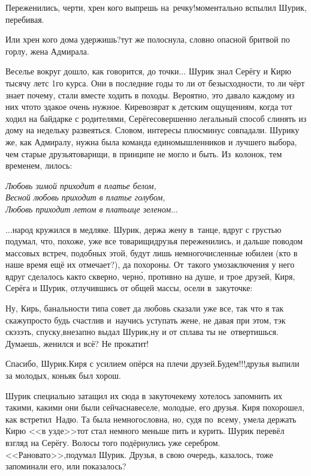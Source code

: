 {\diagdash Переженились, черти, хрен кого выпрешь на~речку!\mdash моментально вспылил Шурик, перебивая.

\diagdash Или хрен кого дома удержишь?\mdash тут же полоснула, словно опасной бритвой по горлу, жена Адмирала. 

Веселье вокруг дошло, как говорится, до точки$\ldots$ Шурик знал Серёгу и Кирю тысячу лет\mdash с 1\sdash го курса. Они в последние годы то ли от безысходности, то ли чёрт знает почему, стали вместе ходить в походы. Вероятно, это давало каждому из них что\sdash то эдакое очень нужное. Кире\mdash возврат к детским ощущениям, когда тот ходил на байдарке с родителями, Серёге\mdash совершенно легальный способ слинять из дому на недельку развеяться. Словом, интересы плюс\sdash минус совпадали. Шурику же, как Адмиралу, нужна была команда единомышленников и лучшего выбора, чем старые друзья\sdash товарищи, в принципе не могло и быть. Из~колонок, тем временем, лилось:

\vspace{0.1cm}
\noindent\textit{%
	\hspace*{1.4cm}Любовь зимой приходит в платье белом,\\
	\hspace*{1.4cm}Весной любовь приходит в платье голубом,\\
	\hspace*{1.4cm}Любовь приходит летом в платьице зеленом$\ldots$
}

$\ldots$народ кружился в медляке. Шурик, держа жену в~танце, вдруг с грустью подумал, что, похоже, уже все товарищи\sdash друзья переженились, и дальше поводом массовых встреч, подобных этой, будут лишь немногочисленные юбилеи (кто в наше время ещё их отмечает?), да похороны. От~такого умозаключения у него вдруг сделалось как\sdash то скверно, черн\'{о}, противно на душе, и трое друзей, Киря, Серёга и Шурик, отлучившись от общей массы, осели в~закуточке:

\diagdash Ну, Кирь, банальности типа совет да любовь сказали уже все, так что я так скажу\mdash просто будь счастлив и~научись уступать жене, не давая при этом, тэк скэзэть, спуску,\mdash внезапно выдал Шурик,\mdash ну и от сплава ты не~отвертишься. Думаешь, женился и всё? Не прокатит!

\diagdash Спасибо, Шурик.\mdash Киря с усилием опёрся на плечи друзей.\mdash Будем!!!\mdash друзья выпили за молодых, коньяк был хорош.

Шурик специально затащил их сюда в закуточек\mdash ему хотелось запомнить их такими, какими они были сейчас\mdash навеселе, молодые, его друзья. Киря похорошел, как встретил~Надю. Та была немногословна, но, судя по~всему, умела держать Кирю <<в узде>>\mdash тот стал немного меньше пить и курить. Шурик перевёл взгляд на Серёгу. Волосы того подёрнулись уже серебром. <<Рановато>>,\mdash подумал Шурик. Друзья, в свою очередь, казалось, тоже запоминали его, или показалось?

}
